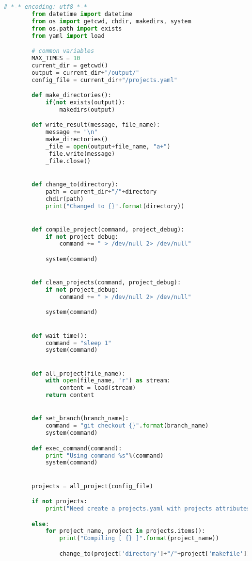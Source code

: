 \begin{apendicesenv}
\begin{lstlisting}[language=Python, caption={Script de Recompilações},
                  label=script_recompilacoes]
        # *-* encoding: utf8 *-*
        from datetime import datetime
        from os import getcwd, chdir, makedirs, system
        from os.path import exists
        from yaml import load

        # common variables
        MAX_TIMES = 10
        current_dir = getcwd()
        output = current_dir+"/output/"
        config_file = current_dir+"/projects.yaml"

        def make_directories():
            if(not exists(output)):
                makedirs(output)

        def write_result(message, file_name):
            message += "\n"
            make_directories()
            _file = open(output+file_name, "a+")
            _file.write(message)
            _file.close()


        def change_to(directory):
            path = current_dir+"/"+directory
            chdir(path)
            print("Changed to {}".format(directory))


        def compile_project(command, project_debug):
            if not project_debug:
                command += " > /dev/null 2> /dev/null"

            system(command)


        def clean_projects(command, project_debug):
            if not project_debug:
                command += " > /dev/null 2> /dev/null"

            system(command)


        def wait_time():
            command = "sleep 1"
            system(command)


        def all_project(file_name):
            with open(file_name, 'r') as stream:
                content = load(stream)
            return content


        def set_branch(branch_name):
            command = "git checkout {}".format(branch_name)
            system(command)

        def exec_command(command):
            print "Using command %s"%(command)
            system(command)


        projects = all_project(config_file)

        if not projects:
            print("Need create a projects.yaml with projects attributes")

        else:
            for project_name, project in projects.items():
                print("Compiling [ {} ]".format(project_name))

                change_to(project['directory']+"/"+project['makefile'])


\end{lstlisting}
\end{apendicesenv}
